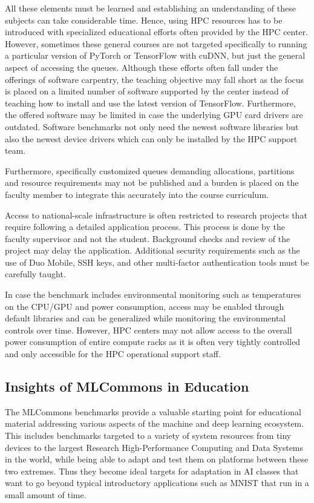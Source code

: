 \documentclass[utf8]{FrontiersinVancouver} %
\begin{document}
All these elements must be learned and establishing an
understanding of these subjects can take considerable time. Hence,
using HPC resources has to be introduced with specialized educational
efforts often provided by the HPC center. However, sometimes these
general courses are not targeted specifically to running a particular
version of PyTorch or TensorFlow with cuDNN, but just the general
aspect of accessing the queues. Although these efforts often
fall under the offerings of software carpentry, the teaching objective
may fall short as the focus is placed on a limited number of software
supported by the center instead of teaching how to install and use the latest
version of TensorFlow. Furthermore, the offered software
may be limited in case the underlying GPU card drivers are outdated.
Software benchmarks not only need the newest software
libraries but also the newest device drivers which can only be
installed by the HPC support team.

Furthermore, specifically customized queues demanding allocations,
partitions and resource requirements may not be published and a burden
is placed on the faculty member to integrate this accurately into the
course curriculum.

Access to national-scale infrastructure is often restricted to
research projects that require following a detailed application
process. This process is done by the faculty supervisor and not the
student. Background checks and review of the project may delay the
application. Additional security requirements such as the use of Duo
Mobile, SSH keys, and other multi-factor authentication tools must be
carefully taught.

In case the benchmark includes environmental monitoring such as
temperatures on the CPU/GPU and power consumption, access may be
enabled through default libraries and can be generalized while
monitoring the environmental controls over time. However, HPC centers
may not allow access to the overall power consumption of entire
compute racks as it is often very tightly controlled and only
accessible for the HPC operational support staff.

\subsection{Insights of MLCommons in Education}
\label{sec:edu-mlcommons-insights}

The MLCommons benchmarks provide a valuable starting point for
educational material addressing various aspects of the machine and
deep learning ecosystem. This includes benchmarks targeted to a
variety of system resources from tiny devices to the largest Research
High-Performance Computing and Data Systems in the world, while being
able to adapt and test them on platforms between these two
extremes. Thus they become ideal targets for adaptation in AI classes
that want to go beyond typical introductory applications such as MNIST
that run in a small amount of time.
\end{document}
